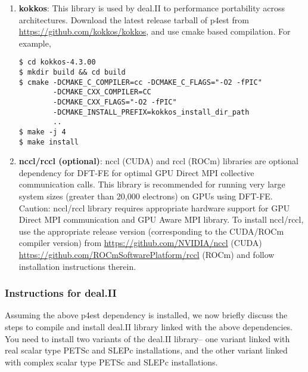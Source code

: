 \begin{enumerate}

\item   {\bf kokkos}: This library is used by deal.II to performance portability across architectures. Download the latest release tarball of p4est from \url{https://github.com/kokkos/kokkos}, and use cmake based compilation. For example,
\begin{verbatim}
$ cd kokkos-4.3.00
$ mkdir build && cd build
$ cmake -DCMAKE_C_COMPILER=cc -DCMAKE_C_FLAGS="-O2 -fPIC"
        -DCMAKE_CXX_COMPILER=CC 
        -DCMAKE_CXX_FLAGS="-O2 -fPIC" 
        -DCMAKE_INSTALL_PREFIX=kokkos_install_dir_path
        ..
$ make -j 4
$ make install
\end{verbatim}


\item {\bf nccl/rccl (optional)}: nccl (CUDA) and rccl (ROCm) libraries are optional dependency for DFT-FE for optimal GPU Direct MPI collective communication calls. This library is recommended for running very large system sizes (greater than 20,000 electrons) on GPUs using DFT-FE. Caution: nccl/rccl library requires appropriate hardware support for GPU Direct MPI communication and GPU Aware MPI library. To install nccl/rccl, use the appropriate release version (corresponding to the CUDA/ROCm compiler version) from \url{https://github.com/NVIDIA/nccl} (CUDA) \url{https://github.com/ROCmSoftwarePlatform/rccl} (ROCm) and follow installation instructions therein.

\end{enumerate}


\subsubsection{Instructions for deal.II}
Assuming the above p4est dependency is installed, we now briefly discuss the steps to compile and install deal.II library linked with the above dependencies. You need to install two variants of the deal.II library-- one variant linked with real scalar type PETSc and SLEPc installations, and the other variant linked with complex scalar type PETSc and SLEPc installations. 

